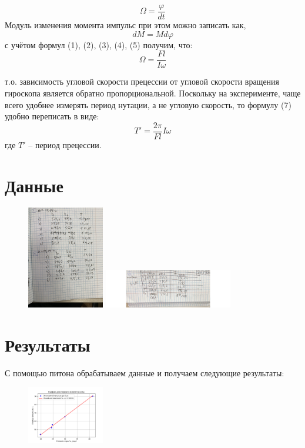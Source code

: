 \documentclass[a4paper]{article}
\begin{document}
\begin{equation}
    \Omega = \frac{\varphi}{d t}
\end{equation}
Модуль изменения момента импульс при этом можно записать
как,
\begin{equation}
    d M = M d \varphi
\end{equation}
с учётом формул (1), (2), (3), (4), (5) получим, что:
\begin{equation}
\Omega = \frac{Fl}{I\omega}
\end{equation}

т.о. зависимость угловой скорости прецессии от угловой скорости вращения гироскопа является обратно пропорциональной. Поскольку на эксперименте, чаще всего удобнее измерять период
нутации, а не угловую скорость, то формулу (7) удобно переписать в виде:
\begin{equation}
    T'=\dfrac{2\pi}{Fl}I\omega
\end{equation}
где $T'$ – период прецессии.


\section{\textbf{Данные}}

\begin{figure}[H]
\begin{center}
\includegraphics[width=0.3\textwidth]{pick_2.png}
\includegraphics[width=0.5\textwidth]{pick_3.png}
\end{center}
\end{figure}


\section{\textbf{Результаты}}

С помощью питона обрабатываем данные и получаем следующие результаты:


\begin{figure}[H]
\begin{center}
\includegraphics[width=0.3\textwidth]{pick_4.png}
\end{center}
\end{figure}
\end{document}
